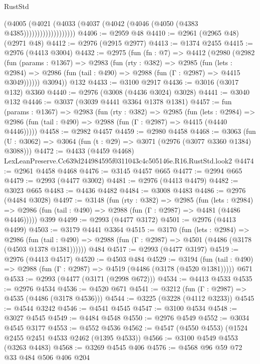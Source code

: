 \begin{lexlean}{RustStd}
\begin{coremodule}
                          (@4005
                            (@4021
                              (@4033 (@4037 (@4042 (@4046 (@4050 (@4383 @4385)))))))))))))))))))
@4406 := @2959 @48
@4410 := @2961 (@2965 @48) (@2971 @48)
@4412 := @2976 (@2915 @2977)
@4413 := @1374 @2455
@4415 := @2976 (@4413 @3004)
@4432 := @2975
    (fun (fn : @7) =>
    @4412
      (@2980
        (@2982
          (fun (params : @1367) =>
          @2983
            (fun (rty : @382) =>
            @2985
              (fun (lets : @2984) =>
              @2986 (fun (tail : @490) => @2988 (fun (Γ : @2987) => @4415 @3049))))))
        @3094))
    @132
@4433 := @3100 @2917
@4436 := @3016 (@3017 @132) @3360
@4440 := @2976 (@3008 (@4436 @3024) @3028)
@4441 := @3040 @132
@4446 := @3037 (@3039 @4441 @3364 @1378 @1381)
@4457 := fun (params : @1367) =>
  @2983
    (fun (rty : @382) =>
    @2985
      (fun (lets : @2984) =>
      @2986 (fun (tail : @490) => @2988 (fun (Γ : @2987) => @4415 (@4440 @4446)))))
@4458 := @2982 @4457
@4459 := @2980 @4458
@4468 := @3063 (fun (U : @3062) => @3064 (fun (t : @29) => @3071 (@2976 (@3077 @3360 @1384) @3088)))
@4472 := @4433 (@4459 @4468) LexLeanPreserve.Cc639d244984595f0311043c4c505146e.R16.RustStd.look2
@4474 := @2961 @4458 @4468
@4476 := @3145 @4457 @665
@4477 := @2994 @665
@4479 := @2993 (@4477 @3002)
@4481 := @2976 (@4413 @4479)
@4482 := @3023 @665
@4483 := @4436 @4482
@4484 := @3008 @4483
@4486 := @2976 (@4484 @3028)
@4497 := @3148
    (fun (rty : @382) =>
    @2985
      (fun (lets : @2984) =>
      @2986 (fun (tail : @490) => @2988 (fun (Γ : @2987) => @4481 (@4486 @4446)))))
    @399
@4499 := @2993 (@4477 @3172)
@4501 := @2976 (@4413 @4499)
@4503 := @3179 @4441 @3364
@4515 := @3170
    (fun (lets : @2984) =>
    @2986
      (fun (tail : @490) => @2988 (fun (Γ : @2987) => @4501 (@4486 (@3178 (@4503 @1378 @1381))))))
    @484
@4517 := @2993 (@4477 @3197)
@4519 := @2976 (@4413 @4517)
@4520 := @4503 @484
@4529 := @3194
    (fun (tail : @490) => @2988 (fun (Γ : @2987) => @4519 (@4486 (@3178 (@4520 @1381)))))
    @671
@4533 := @2993 (@4477 (@3171 (@2998 @672)))
@4534 := @4413 @4533
@4535 := @2976 @4534
@4536 := @4520 @671
@4541 := @3212 (fun (Γ : @2987) => @4535 (@4486 (@3178 @4536)))
@4544 := @3225 (@3228 (@4112 @3233))
@4545 := @4544 @3242
@4546 := @4541 @4545
@4547 := @3100 @4534
@4548 := @3027 @4545
@4549 := @4484 @4548
@4550 := @2976 @4549
@4552 := @3034 @4545 @3177
@4553 := @4552 @4536
@4562 := @4547 (@4550 @4553) (@1524 @2455 @2451 @4533 @2462 (@1395 @4533))
@4566 := @3100 @4549 @4553 (@3263 @4483)
@4568 := @3269 @4545 @406
@4576 := @4568 @96 @59 @72 @33 @484 @506 @406 @204

\end{coremodule}
\end{lexlean}
